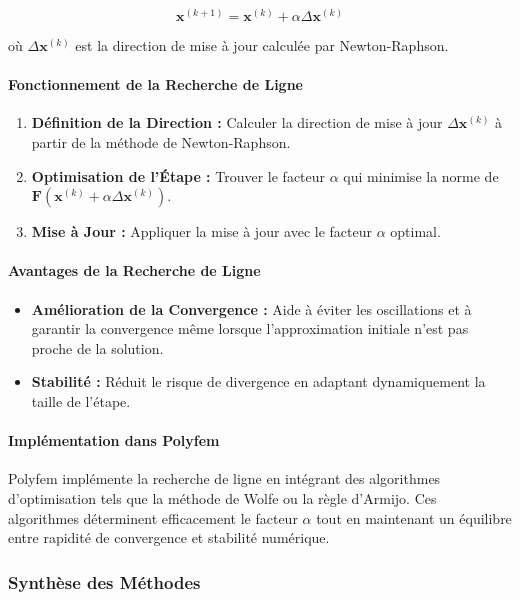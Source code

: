 \[
\mathbf{x}^{(k+1)} = \mathbf{x}^{(k)} + \alpha \Delta \mathbf{x}^{(k)}
\]

où \( \Delta \mathbf{x}^{(k)} \) est la direction de mise à jour calculée par Newton-Raphson.

\paragraph{Fonctionnement de la Recherche de Ligne}
\begin{enumerate}
    \item \textbf{Définition de la Direction :} Calculer la direction de mise à jour \( \Delta \mathbf{x}^{(k)} \) à partir de la méthode de Newton-Raphson.
    \item \textbf{Optimisation de l'Étape :} Trouver le facteur \( \alpha \) qui minimise la norme de \( \mathbf{F}(\mathbf{x}^{(k)} + \alpha \Delta \mathbf{x}^{(k)}) \).
    \item \textbf{Mise à Jour :} Appliquer la mise à jour avec le facteur \( \alpha \) optimal.
\end{enumerate}

\paragraph{Avantages de la Recherche de Ligne}
\begin{itemize}
    \item \textbf{Amélioration de la Convergence :} Aide à éviter les oscillations et à garantir la convergence même lorsque l'approximation initiale n'est pas proche de la solution.
    \item \textbf{Stabilité :} Réduit le risque de divergence en adaptant dynamiquement la taille de l'étape.
\end{itemize}

\paragraph{Implémentation dans Polyfem}

Polyfem implémente la recherche de ligne en intégrant des algorithmes d'optimisation tels que la méthode de Wolfe ou la règle d'Armijo. Ces algorithmes déterminent efficacement le facteur \( \alpha \) tout en maintenant un équilibre entre rapidité de convergence et stabilité numérique.

\subsubsection{Synthèse des Méthodes}

